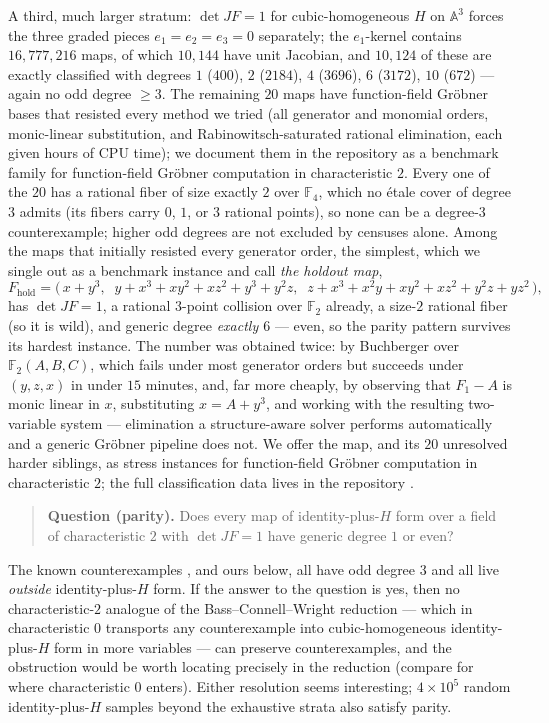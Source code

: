 \documentclass[11pt]{amsart}
\newcommand{\F}{\mathbb{F}}
\newcommand{\A}{\mathbb{A}}
\begin{document}
A third, much larger stratum:
$\det JF = 1$ for cubic-homogeneous $H$ on $\A^3$ forces the three
graded pieces $e_1 = e_2 = e_3 = 0$ separately; the $e_1$-kernel
contains $16{,}777{,}216$ maps, of which $10{,}144$ have unit Jacobian,
and $10{,}124$ of these are exactly classified with degrees
$1$ ($400$), $2$ ($2184$), $4$ ($3696$), $6$ ($3172$), $10$ ($672$) ---
again no odd degree $\ge 3$. The remaining $20$ maps have
function-field Gr\"obner bases that resisted every method we tried
(all generator and monomial orders, monic-linear substitution,
and Rabinowitsch-saturated rational elimination, each given hours of
CPU time); we document them in the repository \cite{repo} as a
benchmark family for function-field Gr\"obner computation in
characteristic $2$. Every one of the $20$ has a rational fiber of size
exactly $2$ over $\F_4$, which no \'etale cover of degree $3$ admits
(its fibers carry $0$, $1$, or $3$ rational points), so none can be a
degree-$3$ counterexample; higher odd degrees are not excluded by
censuses alone. Among the maps
that initially resisted every generator order, the simplest, which we single out as a
benchmark instance and call \emph{the holdout map},
\[
F_{\mathrm{hold}} = \bigl(\, x + y^3,\;\;
y + x^3 + xy^2 + xz^2 + y^3 + y^2z,\;\;
z + x^3 + x^2y + xy^2 + xz^2 + y^2z + yz^2 \,\bigr),
\]
has $\det JF = 1$, a rational $3$-point collision over $\F_2$ already,
a size-$2$ rational fiber (so it is wild), and generic degree
\emph{exactly $6$} --- even, so the parity pattern survives its hardest
instance. The number was obtained twice: by Buchberger over
$\F_2(A,B,C)$, which fails under most generator orders but succeeds
under $(y,z,x)$ in under $15$ minutes, and, far more cheaply, by
observing that $F_1 - A$ is monic linear in $x$, substituting
$x = A + y^3$, and working with the resulting two-variable system ---
elimination a structure-aware solver performs automatically and a
generic Gr\"obner pipeline does not. We offer the map, and its $20$
unresolved harder siblings, as stress instances for function-field
Gr\"obner computation in characteristic $2$; the full classification
data lives in the repository \cite{repo}.

\begin{quote}
\textbf{Question (parity).} Does every map of identity-plus-$H$ form
over a field of characteristic $2$ with $\det JF = 1$ have generic
degree $1$ or even?
\end{quote}

The known counterexamples \cite{hk,mondello}, and ours below, all have
odd degree $3$ and all live \emph{outside} identity-plus-$H$ form. If
the answer to the question is yes, then no characteristic-$2$ analogue
of the Bass--Connell--Wright reduction --- which in characteristic $0$
transports any counterexample into cubic-homogeneous
identity-plus-$H$ form in more variables --- can preserve
counterexamples, and the obstruction would be worth locating precisely
in the reduction (compare \cite{vde} for where characteristic $0$
enters). Either resolution seems interesting; $4 \times 10^5$ random
identity-plus-$H$ samples beyond the exhaustive strata also satisfy
parity.
\end{document}
